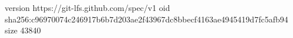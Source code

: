 version https://git-lfs.github.com/spec/v1
oid sha256:c96970074c246917b6b7d203ae2f43967dc8bbecf4163ae4945419d7fc5afb94
size 43840

